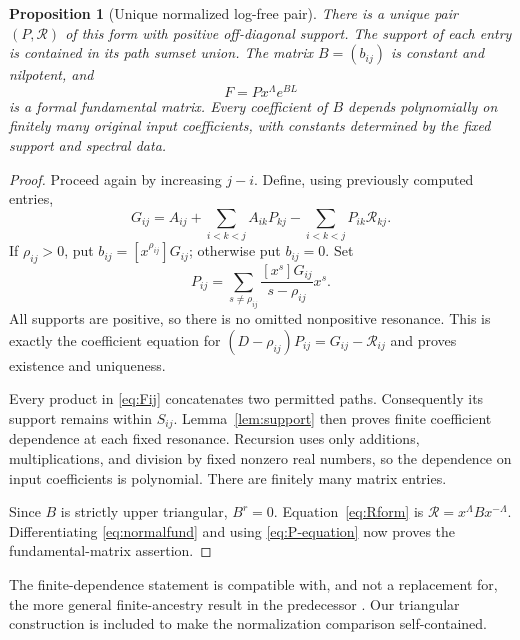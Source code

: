 \documentclass[11pt,a4paper]{article}
\numberwithin{equation}{section}
\newtheorem{proposition}[theorem]{Proposition}
\theoremstyle{definition}
\theoremstyle{remark}
\begin{document}
\begin{proposition}[Unique normalized log-free pair]\label{prop:normal}
There is a unique pair $(P,\mathcal R)$ of this form with positive
 off-diagonal support. The support of each entry is contained in its path
sumset union. The matrix $B=(b_{ij})$ is constant and nilpotent, and
\begin{equation}\label{eq:normalfund}
 F=P x^\Lambda e^{BL}
\end{equation}
is a formal fundamental matrix. Every coefficient of $B$ depends
polynomially on finitely many original input coefficients, with constants
determined by the fixed support and spectral data.
\end{proposition}
\begin{proof}
Proceed again by increasing $j-i$. Define, using previously computed
entries,
\begin{equation}\label{eq:Fij}
 G_{ij}=A_{ij}+\sum_{i<k<j}A_{ik}P_{kj}
                       -\sum_{i<k<j}P_{ik}\mathcal R_{kj}.
\end{equation}
If $\rho_{ij}>0$, put
$b_{ij}=[x^{\rho_{ij}}]G_{ij}$; otherwise put $b_{ij}=0$. Set
\begin{equation}\label{eq:Pcoeff}
 P_{ij}=\sum_{s\ne\rho_{ij}}
                 \frac{[x^s]G_{ij}}{s-\rho_{ij}}x^s.
\end{equation}
All supports are positive, so there is no omitted nonpositive resonance.
This is exactly the coefficient equation for
$(D-\rho_{ij})P_{ij}=G_{ij}-\mathcal R_{ij}$ and proves existence and
uniqueness.

Every product in \eqref{eq:Fij} concatenates two permitted paths.
Consequently its support remains within $S_{ij}$. Lemma~\ref{lem:support}
then proves finite coefficient dependence at each fixed resonance.
Recursion uses only additions, multiplications, and division by fixed
nonzero real numbers, so the dependence on input coefficients is
polynomial. There are finitely many matrix entries.

Since $B$ is strictly upper triangular, $B^r=0$. Equation~\eqref{eq:Rform}
is $\mathcal R=x^\Lambda Bx^{-\Lambda}$. Differentiating
\eqref{eq:normalfund} and using \eqref{eq:P-equation} now proves the
fundamental-matrix assertion.
\end{proof}

The finite-dependence statement is compatible with, and not a replacement
for, the more general finite-ancestry result in the predecessor
\cite{repo-hahn}. Our triangular construction is included to make the
normalization comparison self-contained.
\end{document}
